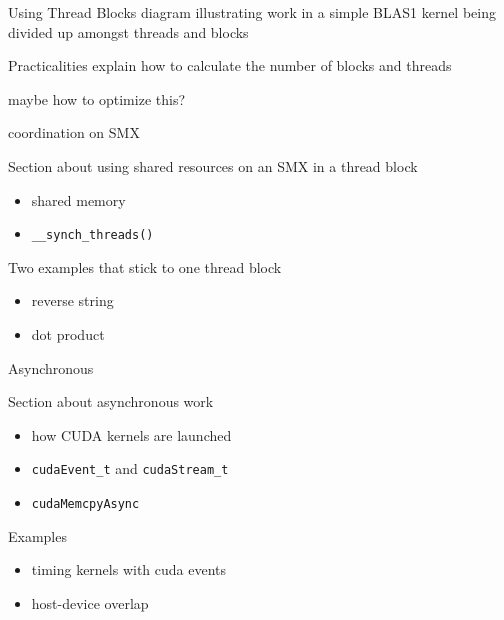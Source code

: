 \documentclass[aspectratio=43]{beamer}
\newcommand{\lst}[1]{\colorbox{white!90!blue}{\lstinline!#1!}}
\begin{document}
\begin{frame}[fragile]{Using Thread Blocks}
    diagram illustrating work in a simple BLAS1 kernel being divided up amongst threads and blocks
\end{frame}

\begin{frame}[fragile]{Practicalities}
    explain how to calculate the number of blocks and threads

    maybe how to optimize this?
\end{frame}


\begin{frame}[fragile]{coordination on SMX}
    \begin{info}{}
        Section about using shared resources on an SMX in a thread block
        \begin{itemize}
            \item shared memory
            \item \lst{__synch_threads()}
        \end{itemize}
        Two examples that stick to one thread block
        \begin{itemize}
            \item reverse string
            \item dot product
        \end{itemize}
    \end{info}

\end{frame}


\begin{frame}[fragile]{Asynchronous}
    \begin{info}{}
        Section about asynchronous work
        \begin{itemize}
            \item how CUDA kernels are launched
            \item \lst{cudaEvent_t} and \lst{cudaStream_t}
            \item \lst{cudaMemcpyAsync}
        \end{itemize}
        Examples
        \begin{itemize}
            \item timing kernels with cuda events
            \item host-device overlap
        \end{itemize}
    \end{info}

\end{frame}
\end{document}
